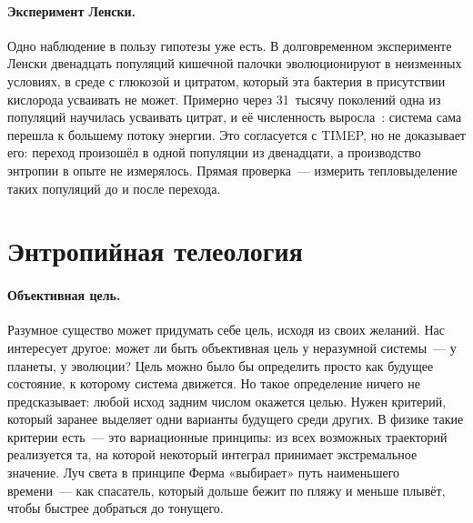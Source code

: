 \documentclass[11pt,a4paper]{article}
\begin{document}
\paragraph{Эксперимент Ленски.}
Одно наблюдение в пользу гипотезы уже есть. В долговременном эксперименте Ленски двенадцать популяций кишечной палочки эволюционируют в неизменных условиях, в среде с глюкозой и цитратом, который эта бактерия в присутствии кислорода усваивать не может. Примерно через 31~тысячу поколений одна из популяций научилась усваивать цитрат, и её численность выросла~\cite{blount2008}: система сама перешла к большему потоку энергии. Это согласуется с TIMEP, но не доказывает его: переход произошёл в одной популяции из двенадцати, а производство энтропии в опыте не измерялось. Прямая проверка~--- измерить тепловыделение таких популяций до и после перехода.

\section{Энтропийная телеология}\label{sec:teleology}

\paragraph{Объективная цель.}
Разумное существо может придумать себе цель, исходя из своих желаний. Нас интересует другое: может ли быть объективная цель у неразумной системы~--- у планеты, у эволюции? Цель можно было бы определить просто как будущее состояние, к которому система движется. Но такое определение ничего не предсказывает: любой исход задним числом окажется целью. Нужен критерий, который заранее выделяет одни варианты будущего среди других. В физике такие критерии есть~--- это вариационные принципы: из всех возможных траекторий реализуется та, на которой некоторый интеграл принимает экстремальное значение. Луч света в принципе Ферма «выбирает» путь наименьшего времени~--- как спасатель, который дольше бежит по пляжу и меньше плывёт, чтобы быстрее добраться до тонущего.
\end{document}
